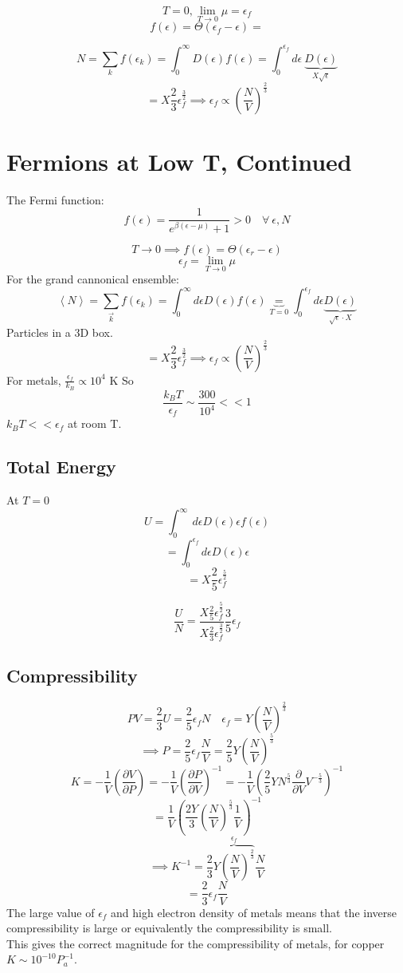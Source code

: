\documentclass[11pt]{book}
\theoremstyle{definition}
\begin{document}
\[ T=0, \lim_{T \to 0} \mu = \epsilon_f \] 
\[ f(\epsilon) = \Theta( \epsilon_f - \epsilon ) = \]

\[ N = \sum_k f( \epsilon_k ) = \int_{0}^{\infty} D(\epsilon)f(\epsilon) = \int_0^{\epsilon_f} d \epsilon \: \underbrace{D(\epsilon)}_{X\sqrt{\epsilon}}   \] 
\[ = X \frac{2}{3} \epsilon_{f}^{\frac{3}{2}} \implies \epsilon_f \propto (\frac{N}{V})^{\frac{2}{3}}\] 

\newpage
\section{Fermions at Low T, Continued}
The Fermi function:
\[ f(\epsilon) = \frac{1}{e^{\beta(\epsilon-\mu)}+1} > 0 \quad \forall \: \epsilon,N\] 

\[ T \to 0 \implies f(\epsilon) = \Theta(\epsilon_r - \epsilon) \] 
\[ \epsilon_f = \lim_{T \to 0} \mu \] 
For the grand cannonical ensemble:
\[\left \langle N \right \rangle  = \sum_{\vec{k}} f(\epsilon_k) = \int_0^{\infty} d \epsilon D(\epsilon) f(\epsilon)
\underbrace{=}_{T=0} \int_0^{\epsilon_f} d \epsilon 
\underbrace{D(\epsilon)}_{\sqrt{\epsilon}\cdot X} \] 
Particles in a 3D box.
\[ = X \frac{2}{3} \epsilon_f^{\frac{3}{2}} \implies \epsilon_f \propto \left( \frac{N}{V} \right)^{\frac{2}{3}} \] 
For metals, $ \frac{\epsilon_f}{k_B} \propto 10^4 $ K 
So
\[ \frac{k_BT}{\epsilon_f} \sim \frac{300}{10^4} << 1 \] 
$k_BT << \epsilon_f $ at room T.
\subsection{Total Energy}
At $ T = 0 $ 
\[U = \int_0^{\infty} \:d{\epsilon} {D(\epsilon) \epsilon f(\epsilon)} \]
\[ = \int_0^{\epsilon_f} d \epsilon D(\epsilon ) \epsilon \] 
\[ = X \frac{2}{5} \epsilon_f^{\frac{5}{2}} \] 

\[ \frac{U}{N} = \frac{X \frac{2}{5} \epsilon_f^{\frac{5}{2}}}{X \frac{2}{3} \epsilon_f^{\frac{3}{2}}} \frac{3}{5} \epsilon_f \] 

\subsection{Compressibility}
\[ PV = \frac{2}{3}U = \frac{2}{5} \epsilon_f N \quad \epsilon_f = Y \left(\frac{N}{V} \right)^{\frac{2}{3}}\] 
\[ \implies P = \frac{2}{5} \epsilon_f \frac{N}{V} = \frac{2}{5}Y \left( \frac{N}{V} \right)^{\frac{5}{3}} \] 
\[ K = -\frac{1}{V} \left( \frac{\partial V}{\partial P} \right) = - \frac{1}{V} \left( \frac{\partial P}{\partial V} \right)^{-1} = -\frac{1}{V}\left( \frac{2}{5}YN^{\frac{5}{3}}\frac{\partial }{\partial V} V^{-\frac{5}{3}}  \right)^{-1}    \] 
\[ = \frac{1}{V}\left( \frac{2Y}{3}(\frac{N}{V})^{\frac{5}{3}} \frac{1}{V} \right)^{-1}  \] 
\[ \implies K^{-1} = \frac{2}{3}
\overbrace{Y \left(\frac{N}{V} \right)^{\frac{2}{3}}}^{\epsilon_f} \frac{N}{V}\] 
\[ = \frac{2}{3} \epsilon_f \frac{N}{V} \] 
The large value of $ \epsilon_f $ and high electron density of metals means that the inverse compressibility is large or equivalently the compressibility is small. \\
This gives the correct magnitude for the compressibility of metals, for copper $ K \sim 10^{-10} P_{a}^{-1} $.
\end{document}
